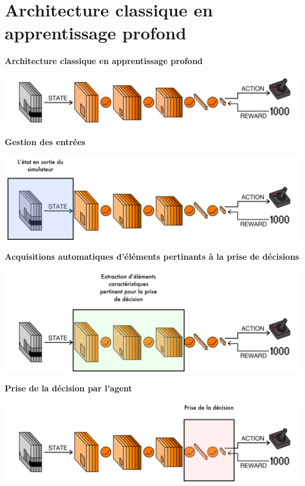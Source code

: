 \section{Architecture classique en apprentissage profond}

\begin{frame}
\textbf{Architecture classique en apprentissage profond}
\begin{center}
    \includegraphics[scale=.3]{./architecturevanilla/vanilla.png}
\end{center}
\end{frame}

\begin{frame}
    \textbf{Gestion des entrées}
\begin{center}
    \includegraphics[scale=.3]{./architecturevanilla/stage-0.png}
\end{center}
\end{frame}


\begin{frame}
    \textbf{Acquisitions automatiques d'éléments pertinants à la prise de décisions}
\begin{center}
    \includegraphics[scale=.3]{./architecturevanilla/stage-1.png}
\end{center}
\end{frame}


\begin{frame}
    \textbf{Prise de la décision par l'agent}
\begin{center}
    \includegraphics[scale=.3]{./architecturevanilla/stage-2.png}
\end{center}
\end{frame}


